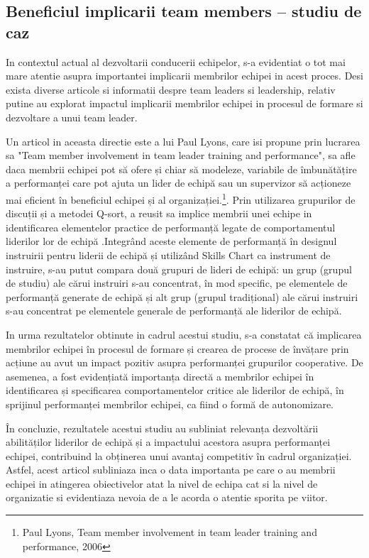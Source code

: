 \documentclass[a4paper, 12pt]{article}
\begin{document}
\begin{itemize}
	\subsection {Beneficiul implicarii team members – studiu de caz }
	
	
	\quad\quad  In contextul actual al dezvoltarii conducerii echipelor, s-a evidentiat o tot mai mare atentie asupra importantei implicarii membrilor echipei in acest proces. Desi exista diverse articole si informatii despre team leaders si leadership, relativ putine au explorat impactul implicarii membrilor echipei in procesul de formare si dezvoltare a unui team leader. 

	\quad Un articol in aceasta directie este a lui Paul Lyons, care isi propune prin lucrarea sa "Team member involvement in team leader training and performance", sa afle daca membrii echipei pot să ofere și chiar să modeleze, variabile de îmbunătățire a performanței care pot ajuta un lider de echipă sau un supervizor să acționeze mai eficient în beneficiul echipei și al organizației.\footnote{Paul Lyons, Team member involvement in team leader training and performance, 2006}.  Prin utilizarea grupurilor de discuții și a metodei Q-sort, a reusit sa implice membrii unei echipe in identificarea elementelor practice de performanță legate de comportamentul liderilor lor de echipă .Integrând aceste elemente de performanță în designul instruirii pentru liderii de echipă și utilizând Skills Chart ca instrument de instruire, s-au putut compara două grupuri de lideri de echipă: un grup (grupul de studiu) ale cărui instruiri s-au concentrat, în mod specific, pe elementele de performanță generate de echipă și alt grup (grupul tradițional) ale cărui instruiri s-au concentrat pe elementele generale de performanță ale liderilor de echipă. 

	\quad In urma rezultatelor obtinute in cadrul acestui studiu, s-a constatat că implicarea membrilor echipei în procesul de formare și crearea de procese de învățare prin acțiune au avut un impact pozitiv asupra performanței grupurilor cooperative. De asemenea, a fost evidențiată importanța directă a membrilor echipei în identificarea și specificarea comportamentelor critice ale liderilor de echipă, în sprijinul performanței membrilor echipei, ca fiind o formă de autonomizare. 

	\quad În concluzie, rezultatele acestui studiu au subliniat relevanța dezvoltării abilităților liderilor de echipă și a impactului acestora asupra performanței echipei, contribuind la obținerea unui avantaj competitiv în cadrul organizației. Astfel, acest articol subliniaza inca o data importanta pe care o au membrii echipei in atingerea obiectivelor atat la nivel de echipa cat si la nivel de organizatie  si evidentiaza nevoia de a le acorda o atentie sporita pe viitor.



\newpage
\end{itemize}
\end{document}
